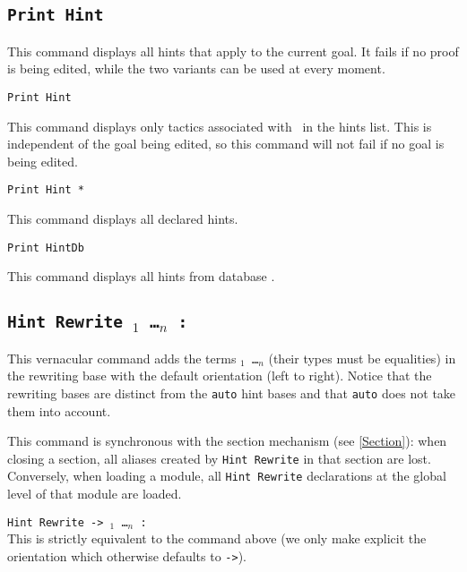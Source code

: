 \begin{coq_example*}
\subsection{\tt Print Hint
\label{PrintHint}
}

This command displays all hints that apply to the current goal. It
fails if no proof is being edited, while the two variants can be used at
every moment.

\begin{Variants}

\item {\tt  Print Hint {\ident} }

 This command displays only tactics associated with \ident\ in the
 hints list. This is independent of the goal being edited, so this
 command will not fail if no goal is being edited.

\item {\tt Print Hint *}

  This command displays all declared hints.

\item {\tt  Print HintDb {\ident} }
\label{PrintHintDb}

 This command displays all hints from database \ident.

\end{Variants}

\subsection{\tt Hint Rewrite \term$_1$ \dots \term$_n$ : \ident
\label{HintRewrite}
}

This vernacular command adds the terms {\tt \term$_1$ \dots \term$_n$}
(their types must be equalities) in the rewriting base {\tt \ident}
with the default orientation (left to right). Notice that the
rewriting bases are distinct from the {\tt auto} hint bases and that
{\tt auto} does not take them into account.

This command is synchronous with the section mechanism (see \ref{Section}):
when closing a section, all aliases created by \texttt{Hint Rewrite} in that
section are lost. Conversely, when loading a module, all \texttt{Hint Rewrite}
declarations at the global level of that module are loaded.

\begin{Variants}
\item {\tt Hint Rewrite -> \term$_1$ \dots \term$_n$ : \ident}\\
This is strictly equivalent to the command above (we only make explicit the
orientation which otherwise defaults to {\tt ->}).


\end{Variants}
\end{coq_example*}
